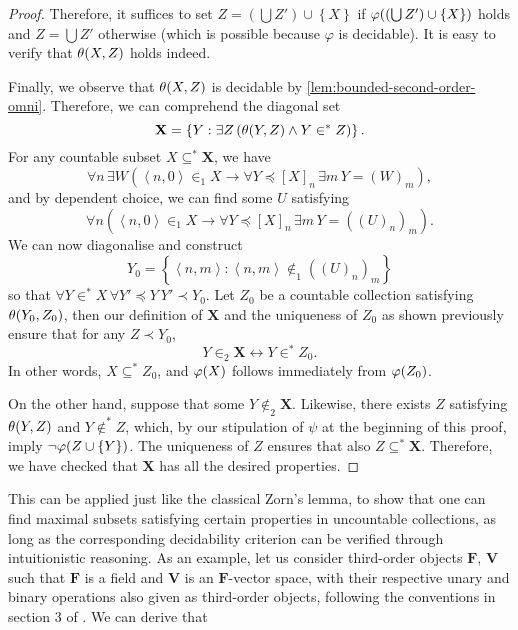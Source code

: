 \documentclass[11pt]{article}
\theoremstyle{plain}
\theoremstyle{definition}
\newcommand{\tuple}[1]{\left\langle #1 \right\rangle}
\begin{document}
\begin{proof}
    Therefore, it suffices to set $Z = \left(\bigcup Z'\right) \cup \left\{X\right\}$ if $\varphi\mleft(\left(\bigcup Z'\right) \cup \left\{X\right\}\mright)$ holds and $Z = \bigcup Z'$ otherwise (which is possible because $\varphi$ is decidable). It is easy to verify that $\theta\mleft(X, Z\mright)$ holds indeed.

    Finally, we observe that $\theta\mleft(X, Z\mright)$ is decidable by \autoref{lem:bounded-second-order-omni}. Therefore, we can comprehend the diagonal set
    \[\mathbf{X} = \left\{Y : \exists Z \left(\theta\mleft(Y, Z\mright) \land Y \in^* Z\right)\right\}.\]
    For any countable subset $X \subseteq^* \mathbf{X}$, we have
    \[\forall n \, \exists W \left(\tuple{n, 0} \in_1 X \rightarrow \forall Y \preceq \left[X\right]_n \, \exists m \, Y = \left(W\right)_m\right),\]
    and by dependent choice, we can find some $U$ satisfying
    \[\forall n \left(\tuple{n, 0} \in_1 X \rightarrow \forall Y \preceq \left[X\right]_n \, \exists m \, Y = \left(\left(U\right)_n\right)_m\right).\]
    We can now diagonalise and construct
    \[Y_0 = \left\{\tuple{n, m} : \tuple{n, m} \not\in_1 \left(\left(U\right)_n\right)_m\right\}\]
    so that $\forall Y \in^* X \, \forall Y' \preceq Y \ Y' \prec Y_0$. Let $Z_0$ be a countable collection satisfying $\theta\mleft(Y_0, Z_0\mright)$, then our definition of $\mathbf{X}$ and the uniqueness of $Z_0$ as shown previously ensure that for any $Z \prec Y_0$,
    \[Y \in_2 \mathbf{X} \leftrightarrow Y \in^* Z_0.\]
    In other words, $X \subseteq^* Z_0$, and $\varphi\mleft(X\mright)$ follows immediately from $\varphi\mleft(Z_0\mright)$.

    On the other hand, suppose that some $Y \not\in_2 \mathbf{X}$. Likewise, there exists $Z$ satisfying $\theta\mleft(Y, Z\mright)$ and $Y \not\in^* Z$, which, by our stipulation of $\psi$ at the beginning of this proof, imply $\neg \varphi\mleft(Z \cup \left\{Y\right\}\mright)$. The uniqueness of $Z$ ensures that also $Z \subseteq^* \mathbf{X}$. Therefore, we have checked that $\mathbf{X}$ has all the desired properties.
\end{proof}

This can be applied just like the classical Zorn's lemma, to show that one can find maximal subsets satisfying certain properties in uncountable collections, as long as the corresponding decidability criterion can be verified through intuitionistic reasoning. As an example, let us consider third-order objects $\mathbf{F}$, $\mathbf{V}$ such that $\mathbf{F}$ is a field and $\mathbf{V}$ is an $\mathbf{F}$-vector space, with their respective unary and binary operations also given as third-order objects, following the conventions in section 3 of \cite{weaver09-cm}. We can derive that
\end{document}
